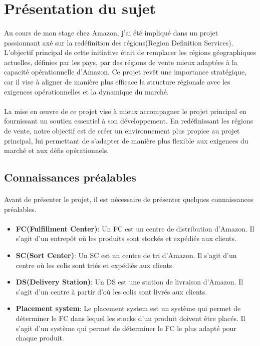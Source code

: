 \section{Présentation du sujet}
\paragraph{}
\vspace{-2em}
Au cours de mon stage chez Amazon, j'ai été impliqué dans un projet passionnant axé sur la redéfinition des régions(Region Definition Services). L'objectif principal de cette initiative était de remplacer les régions géographiques actuelles, définies par les pays, par des régions de vente mieux adaptées à la capacité opérationnelle d'Amazon. Ce projet revêt une importance stratégique, car il vise à aligner de manière plus efficace la structure régionale avec les exigences opérationnelles et la dynamique du marché. 
\paragraph{}
\vspace{-2em}
La mise en œuvre de ce projet vise à mieux accompagner le projet principal en fournissant un soutien essentiel à son développement. En redéfinissant les régions de vente, notre objectif est de créer un environnement plus propice au projet principal, lui permettant de s'adapter de manière plus flexible aux exigences du marché et aux défis opérationnels. 
\subsection{Connaissances préalables}
\paragraph{}
\vspace{-2em}
Avant de présenter le projet, il est nécessaire de présenter quelques connaissances préalables. 
\paragraph{}
\vspace{-2em}

\begin{itemize}
    \item \textbf{FC(Fulfillment Center)}: Un FC est un centre de distribution d'Amazon. Il s'agit d'un entrepôt où les produits sont stockés et expédiés aux clients.
    \item \textbf{SC(Sort Center)}: Un SC est un centre de tri d'Amazon. Il s'agit d'un centre où les colis sont triés et expédiés aux clients.
    \item \textbf{DS(Delivery Station)}: Un DS est une station de livraison d'Amazon. Il s'agit d'un centre à partir d'où les colis sont livrés aux clients.
    \item \textbf{Placement system}: Le placement system est un système qui permet de déterminer le FC dans lequel les stocks d'un produit doivent être placés. Il s'agit d'un système qui permet de déterminer le FC le plus adapté pour chaque produit.
\end{itemize}


